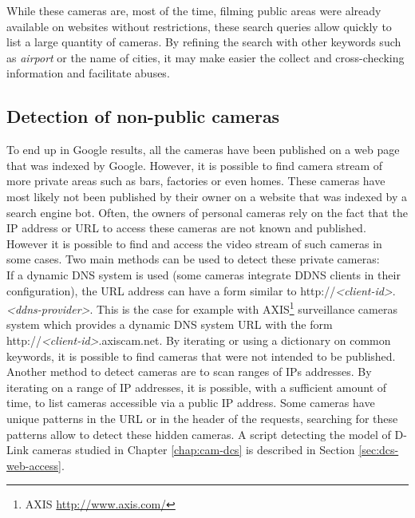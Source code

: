 While these cameras are, most of the time, filming public areas were already available on websites without restrictions, these search queries allow quickly to list a large quantity of cameras.
By refining the search with other keywords such as \emph{airport} or the name of cities, it may make easier the collect and cross-checking information and facilitate abuses.\\

\subsection{Detection of non-public cameras}
\label{sec:cam-detection-hidden}

To end up in Google results, all the cameras have been published on a web page that was indexed by Google.
However, it is possible to find camera stream of more private areas such as bars, factories or even homes.
These cameras have most likely not been published by their owner on a website that was indexed by a search engine bot.
Often, the owners of personal cameras rely on the fact that the IP address or URL to access these cameras are not known and published.
However it is possible to find and access the video stream of such cameras in some cases.
Two main methods can be used to detect these private cameras:\\

If a dynamic DNS system is used (some cameras integrate DDNS clients in their configuration), the URL address can have a form similar to http://\emph{\textless client-id\textgreater}.\emph{\textless ddns-provider\textgreater}.
This is the case for example with AXIS\footnote{AXIS \url{http://www.axis.com/}} surveillance cameras system which provides a dynamic DNS system URL with the form http://\emph{\textless client-id\textgreater}.axiscam.net.
By iterating or using a dictionary on common keywords, it is possible to find cameras that were not intended to be published.\\

Another method to detect cameras are to scan ranges of IPs addresses.
By iterating on a range of IP addresses, it is possible, with a sufficient amount of time, to list cameras accessible via a public IP address.
Some cameras have unique patterns in the URL or in the header of the requests, searching for these patterns allow to detect these hidden cameras.
A script detecting the model of D-Link cameras studied in Chapter \ref{chap:cam-dcs} is described in Section \ref{sec:dcs-web-access}.\\

